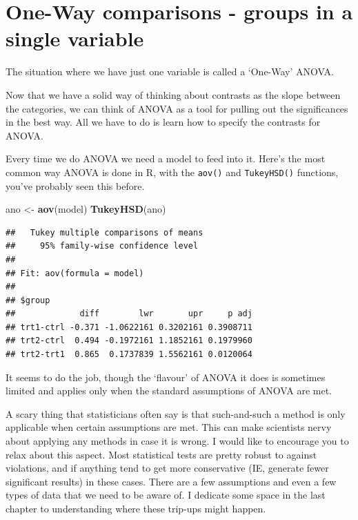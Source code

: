 \documentclass[
]{book}
\newenvironment{Shaded}{\begin{snugshade}}{\end{snugshade}}
\newcommand{\KeywordTok}[1]{\textcolor[rgb]{0.13,0.29,0.53}{\textbf{#1}}}
\newcommand{\NormalTok}[1]{#1}
\newcommand{\StringTok}[1]{\textcolor[rgb]{0.31,0.60,0.02}{#1}}
\newenvironment{sidenote}
{ \begin{tcolorbox}[colbacktitle=blue!50!white,
title=huh?,coltitle=white,
fonttitle=\bfseries] }
{  \end{tcolorbox} }
\begin{document}
\hypertarget{one-way-comparisons---groups-in-a-single-variable}{%
\section{One-Way comparisons - groups in a single variable}\label{one-way-comparisons---groups-in-a-single-variable}}

The situation where we have just one variable is called a `One-Way' ANOVA.

Now that we have a solid way of thinking about contrasts as the slope between the categories, we can think of ANOVA as a tool for pulling out the significances in the best way. All we have to do is learn how to specify the contrasts for ANOVA.

Every time we do ANOVA we need a model to feed into it. Here's the most common way ANOVA is done in R, with the \texttt{aov()} and \texttt{TukeyHSD()} functions, you've probably seen this before.

\begin{Shaded}
\begin{Highlighting}[]
\NormalTok{ano <-}\StringTok{ }\KeywordTok{aov}\NormalTok{(model)}
\KeywordTok{TukeyHSD}\NormalTok{(ano)}
\end{Highlighting}
\end{Shaded}

\begin{verbatim}
##   Tukey multiple comparisons of means
##     95% family-wise confidence level
## 
## Fit: aov(formula = model)
## 
## $group
##             diff        lwr       upr     p adj
## trt1-ctrl -0.371 -1.0622161 0.3202161 0.3908711
## trt2-ctrl  0.494 -0.1972161 1.1852161 0.1979960
## trt2-trt1  0.865  0.1737839 1.5562161 0.0120064
\end{verbatim}

It seems to do the job, though the `flavour' of ANOVA it does is sometimes limited and applies only when the standard assumptions of ANOVA are met.

\begin{sidenote}
A scary thing that statisticians often say is that such-and-such a method is only applicable when certain assumptions are met. This can make scientists nervy about applying any methods in case it is wrong. I would like to encourage you to relax about this aspect. Most statistical tests are pretty robust to against violations, and if anything tend to get more conservative (IE, generate fewer significant results) in these cases. There are a few assumptions and even a few types of data that we need to be aware of. I dedicate some space in the last chapter to understanding where these trip-ups might happen.
\end{sidenote}
\end{document}

